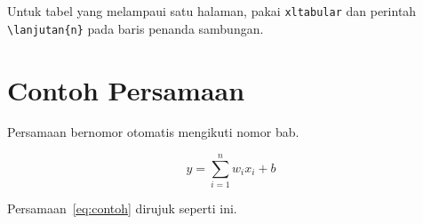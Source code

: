 Untuk tabel yang melampaui satu halaman, pakai \texttt{xltabular} dan perintah
\texttt{\textbackslash lanjutan\{n\}} pada baris penanda sambungan.

\section{Contoh Persamaan}\label{sec:contoh-persamaan}

Persamaan bernomor otomatis mengikuti nomor bab.

\begin{equation}\label{eq:contoh}
  y = \sum_{i=1}^{n} w_i x_i + b
\end{equation}

Persamaan~\ref{eq:contoh} dirujuk seperti ini.
